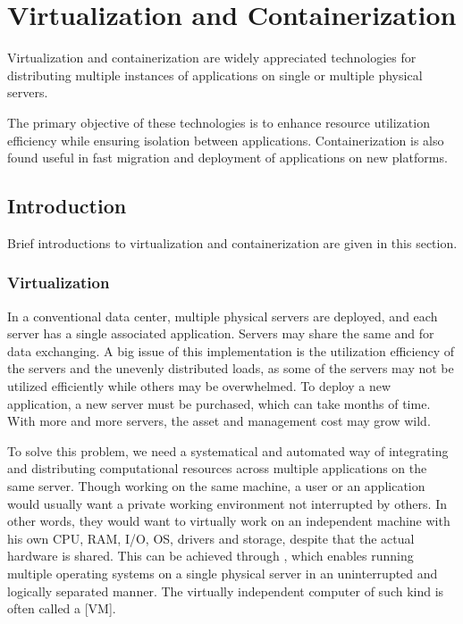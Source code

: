 \chapter{Virtualization and Containerization} \label{ch:vac}

Virtualization and containerization are widely appreciated technologies for distributing multiple instances of applications on single or multiple physical servers. 

The primary objective of these technologies is to enhance resource utilization efficiency while ensuring isolation between applications. Containerization is also found useful in fast migration and deployment of applications on new platforms.

\section{Introduction} \label{sec:vcintro}

Brief introductions to virtualization and containerization are given in this section.

\subsection{Virtualization}

In a conventional data center, multiple physical servers are deployed, and each server has a single associated application. Servers may share the same  and  for data exchanging. A big issue of this implementation is the utilization efficiency of the servers and the unevenly distributed loads, as some of the servers may not be utilized efficiently while others may be overwhelmed. To deploy a new application, a new server must be purchased, which can take months of time. With more and more servers, the asset and management cost may grow wild.

To solve this problem, we need a systematical and automated way of integrating and distributing computational resources across multiple applications on the same server. Though working on the same machine, a user or an application would usually want a private working environment not interrupted by others. In other words, they would want to virtually work on an independent machine with his own CPU, RAM, I/O, OS, drivers and storage, despite that the actual hardware is shared. This can be achieved through , which enables running multiple operating systems on a single physical server in an uninterrupted and logically separated manner. The virtually independent computer of such kind is often called a [VM].

